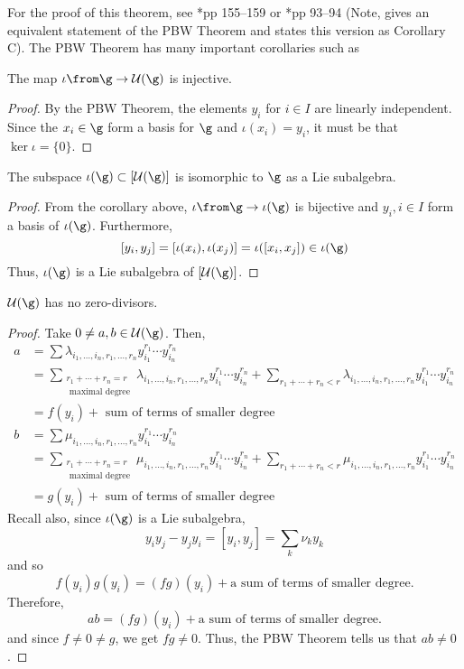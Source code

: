 \documentclass[11pt,leqno,oneside]{amsart}
\numberwithin{thm}{section}
\newcommand{\U}{\mathcal{U}}
\begin{document}
For the proof of this theorem, see \cite{carter}*{pp 155--159} or
\cite{humph}*{pp 93--94} (Note, \cite{humph} gives an equivalent
statement of the PBW Theorem and states this version as Corollary
C). The PBW Theorem has many important corollaries such as
\begin{cor}
  The map \(\iota \from \g \to \U(\g)\) is injective.
\end{cor}
\begin{proof}
  By the PBW Theorem, the elements \(y_i\) for \(i \in I\) are
  linearly independent. Since the \(x_i \in \g\) form a basis for
  \(\g\) and \(\iota(x_i) = y_i\), it must be that \(\ker \iota =
  \{0\}\).   
\end{proof}
\begin{cor}
  The subspace \(\iota(\g) \subset [\U(\g)]\) is isomorphic to
  \(\g\) as a Lie subalgebra.
\end{cor}
\begin{proof}
  From the corollary above, \(\iota \from \g \to \iota(\g)\) is
  bijective and \(y_i, i \in I\) form a basis of
  \(\iota(\g)\). Furthermore, \[
    [y_i,y_j] = [\iota(x_i), \iota(x_j)] = \iota([x_i,x_j]) \in \iota(\g)
  \]
  Thus, \(\iota(\g)\) is a Lie subalgebra of \([\U(\g)]\).
\end{proof}
\begin{cor}
  \(\U(\g)\) has no zero-divisors.
\end{cor}
\begin{proof}
  Take \(0 \neq a,b \in \U(\g)\). Then,
  \begin{align*}
    a & = \sum \lambda_{i_1, \ldots, i_n, r_1, \ldots, r_n}
        y_{i_1}^{r_1} \cdots y_{i_n}^{r_n}  \\
      & = \sum_{\substack{r_1 + \cdots + r_n = r \\ \text{ maximal degree}}} \lambda_{i_1, \ldots, i_n, r_1, \ldots, r_n}
        y_{i_1}^{r_1} \cdots y_{i_n}^{r_n} + \sum_{r_1 + \cdots + r_n
        < r} \lambda_{i_1, \ldots, i_n, r_1, \ldots, r_n}
    y_{i_1}^{r_1} \cdots y_{i_n}^{r_n} \\
      & = f(y_i) + \text{ sum of terms of smaller degree}\\
    b & = \sum \mu_{i_1, \ldots, i_n, r_1, \ldots, r_n}
        y_{i_1}^{r_1} \cdots y_{i_n}^{r_n}  \\
      & = \sum_{\substack{r_1 + \cdots + r_n = r \\ \text{ maximal degree}}} \mu_{i_1, \ldots, i_n, r_1, \ldots, r_n}
        y_{i_1}^{r_1} \cdots y_{i_n}^{r_n} + \sum_{r_1 + \cdots + r_n
        < r} \mu_{i_1, \ldots, i_n, r_1, \ldots, r_n}
    y_{i_1}^{r_1} \cdots y_{i_n}^{r_n} \\
      & = g(y_i) + \text{ sum of terms of smaller degree}
  \end{align*}
  Recall also, since \(\iota(\g)\) is a Lie subalgebra, \[
    y_i y_j - y_j y_i = [y_i,y_j] = \sum_k \nu_k y_k
  \]
  and so  \[
    f(y_i) g(y_i) = (fg)(y_i) + \text{a sum of terms of smaller degree.}
  \]
  Therefore, \[
    ab = (fg)(y_i) + \text{a sum of terms of smaller degree.}
  \]
  and since \(f \neq 0 \neq g\), we get \(fg \neq 0\). Thus, the PBW
  Theorem tells us that \(ab \neq 0\).
\end{proof}
\end{document}
